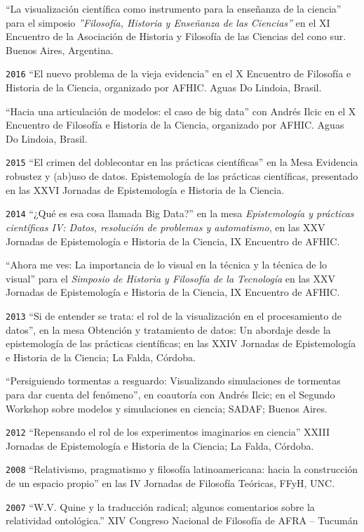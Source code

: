 \documentclass[]{article}
\begin{document}
``La visualización científica como instrumento para la enseñanza de la
ciencia'' para el simposio \emph{''Filosofía, Historia y Enseñanza de
las Ciencias''} en el XI Encuentro de la Asociación de Historia y
Filosofía de las Ciencias del cono sur. Buenos Aires, Argentina.

\texttt{2016} ``El nuevo problema de la vieja evidencia'' en el X
Encuentro de Filosofía e Historia de la Ciencia, organizado por AFHIC.
Aguas Do Lindoia, Brasil.

``Hacia una articulación de modelos: el caso de big data'' con Andrés
Ilcic en el X Encuentro de Filosofía e Historia de la Ciencia,
organizado por AFHIC. Aguas Do Lindoia, Brasil.

\texttt{2015} ``El crimen del doblecontar en las prácticas científicas''
en la Mesa Evidencia robustez y (ab)uso de datos. Epistemología de las
prácticas científicas, presentado en las XXVI Jornadas de Epistemología
e Historia de la Ciencia.

\texttt{2014} ``¿Qué es esa cosa llamada Big Data?'' en la mesa
\emph{Epistemología y prácticas científicas IV: Datos, resolución de
problemas y automatismo}, en las XXV Jornadas de Epistemología e
Historia de la Ciencia, IX Encuentro de AFHIC.

``Ahora me ves: La importancia de lo visual en la técnica y la técnica
de lo visual'' para el \emph{Simposio de Historia y Filosofía de la
Tecnología} en las XXV Jornadas de Epistemología e Historia de la
Ciencia, IX Encuentro de AFHIC.

\texttt{2013} ``Si de entender se trata: el rol de la visualización en
el procesamiento de datos'', en la mesa Obtención y tratamiento de
datos: Un abordaje desde la epistemología de las prácticas científicas;
en las XXIV Jornadas de Epistemología e Historia de la Ciencia; La
Falda, Córdoba.

``Persiguiendo tormentas a resguardo: Visualizando simulaciones de
tormentas para dar cuenta del fenómeno'', en coautoría con Andrés Ilcic;
en el Segundo Workshop sobre modelos y simulaciones en ciencia; SADAF;
Buenos Aires.

\texttt{2012} ``Repensando el rol de los experimentos imaginarios en
ciencia'' XXIII Jornadas de Epistemología e Historia de la Ciencia; La
Falda, Córdoba.

\texttt{2008} ``Relativismo, pragmatismo y filosofía latinoamericana:
hacia la construcción de un espacio propio'' en las IV Jornadas de
Filosofía Teóricas, FFyH, UNC.

\texttt{2007} ``W.V. Quine y la traducción radical; algunos comentarios
sobre la relatividad ontológica.'' XIV Congreso Nacional de Filosofía de
AFRA -- Tucumán
\end{document}
